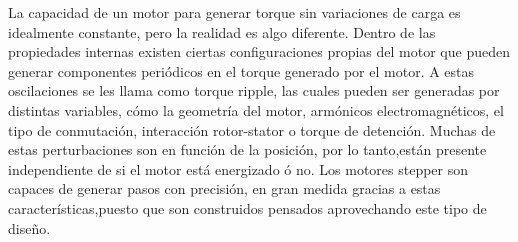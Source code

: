 %
%
%
%
%
%
%
%
%
%
%
La capacidad de un motor para generar torque sin variaciones de carga es idealmente constante, pero la realidad es algo diferente. Dentro de las propiedades internas existen ciertas configuraciones propias del motor que pueden generar componentes periódicos en el torque generado por el motor. A estas oscilaciones se les llama como torque ripple, las cuales pueden ser generadas por distintas variables, cómo la geometría del motor, armónicos electromagnéticos, el tipo de conmutación, interacción rotor-stator o torque de detención. Muchas de estas perturbaciones son en función de la posición, por lo tanto,están presente independiente de si el motor está energizado ó no. Los motores stepper son capaces de generar pasos con precisión, en gran medida gracias a estas características,puesto que son construidos pensados aprovechando este tipo de diseño. 


